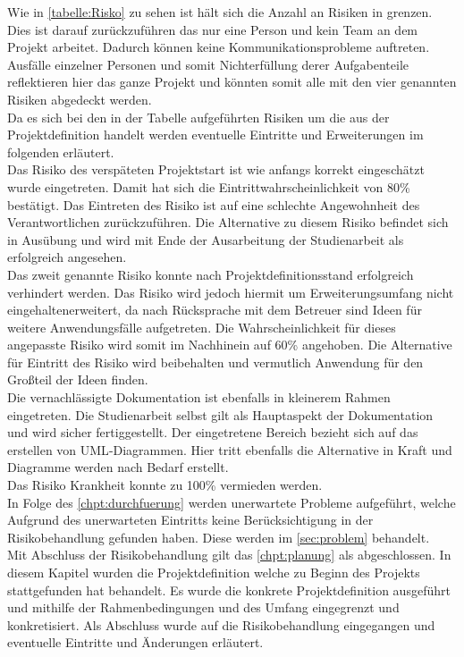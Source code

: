 Wie in \autoref{tabelle:Risko} zu sehen ist hält sich die Anzahl an Risiken in grenzen. Dies ist darauf zurückzuführen das nur eine Person und kein Team an dem Projekt arbeitet. Dadurch können keine Kommunikationsprobleme auftreten. Ausfälle einzelner Personen und somit Nichterfüllung derer Aufgabenteile reflektieren hier das ganze Projekt und könnten somit alle mit den vier genannten Risiken abgedeckt werden.\\
Da es sich bei den in der Tabelle aufgeführten Risiken um die aus der Projektdefinition handelt werden eventuelle Eintritte und Erweiterungen im folgenden erläutert.\\
Das Risiko des verspäteten Projektstart ist wie anfangs korrekt eingeschätzt wurde eingetreten. Damit hat sich die Eintrittwahrscheinlichkeit von 80\% bestätigt. Das Eintreten des Risiko ist auf eine schlechte Angewohnheit des Verantwortlichen zurückzuführen. Die Alternative zu diesem Risiko befindet sich in Ausübung und wird mit Ende der Ausarbeitung der Studienarbeit als erfolgreich angesehen.\\
Das zweit genannte Risiko konnte nach Projektdefinitionsstand erfolgreich verhindert werden. Das Risiko wird jedoch hiermit um \glqq Erweiterungsumfang nicht eingehalten\grqq erweitert, da nach Rücksprache mit dem Betreuer sind Ideen für weitere Anwendungsfälle aufgetreten. Die Wahrscheinlichkeit für dieses angepasste Risiko wird somit im Nachhinein auf 60\% angehoben. Die Alternative für Eintritt des Risiko wird beibehalten und vermutlich Anwendung für den Großteil der Ideen finden.\\
Die vernachlässigte Dokumentation ist ebenfalls in kleinerem Rahmen eingetreten. Die Studienarbeit selbst gilt als Hauptaspekt der Dokumentation und wird sicher fertiggestellt. Der eingetretene Bereich bezieht sich auf das erstellen von \ac{UML}-Diagrammen. Hier tritt ebenfalls die Alternative in Kraft und Diagramme werden nach Bedarf erstellt.\\
Das Risiko Krankheit konnte zu 100\% vermieden werden.\\
In Folge des \autoref{chpt:durchfuerung}  werden unerwartete Probleme aufgeführt, welche Aufgrund des unerwarteten Eintritts keine Berücksichtigung in der Risikobehandlung gefunden haben. Diese werden im \autoref{sec:problem}  behandelt.\\

Mit Abschluss der Risikobehandlung gilt das \autoref{chpt:planung}  als abgeschlossen. In diesem Kapitel wurden die Projektdefinition welche zu Beginn des Projekts stattgefunden hat behandelt. Es wurde die konkrete Projektdefinition ausgeführt und mithilfe der Rahmenbedingungen und des Umfang eingegrenzt und konkretisiert. Als Abschluss wurde auf die Risikobehandlung eingegangen und eventuelle Eintritte und Änderungen erläutert.